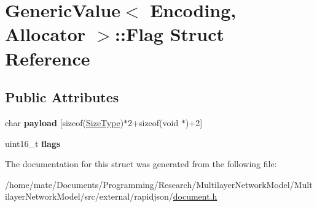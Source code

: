 \hypertarget{structGenericValue_1_1Flag}{}\section{Generic\+Value$<$ Encoding, Allocator $>$\+:\+:Flag Struct Reference}
\label{structGenericValue_1_1Flag}
\subsection*{Public Attributes}
\begin{DoxyCompactItemize}
\item 
char {\bfseries payload} \mbox{[}sizeof(\hyperlink{rapidjson_8h_a5ed6e6e67250fadbd041127e6386dcb5}{Size\+Type})$\ast$2+sizeof(void $\ast$)+2\mbox{]}\hypertarget{structGenericValue_1_1Flag_ac5512252dcb1f2e4b0231dbde504c656}{}\label{structGenericValue_1_1Flag_ac5512252dcb1f2e4b0231dbde504c656}

\item 
uint16\+\_\+t {\bfseries flags}\hypertarget{structGenericValue_1_1Flag_ac91f08067dcc0003fc78e870ca9b2d5d}{}\label{structGenericValue_1_1Flag_ac91f08067dcc0003fc78e870ca9b2d5d}

\end{DoxyCompactItemize}


The documentation for this struct was generated from the following file\+:\begin{DoxyCompactItemize}
\item 
/home/mate/\+Documents/\+Programming/\+Research/\+Multilayer\+Network\+Model/\+Multilayer\+Network\+Model/src/external/rapidjson/\hyperlink{document_8h}{document.\+h}\end{DoxyCompactItemize}
